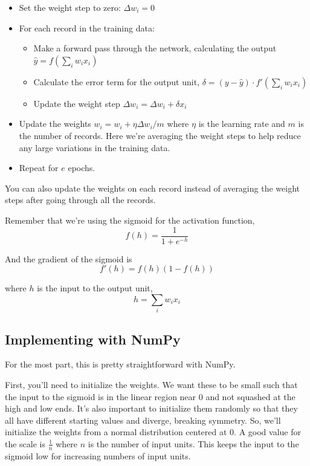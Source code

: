 \begin{itemize}
    \item Set the weight step to zero: \(\Delta w_i = 0\)
    \item For each record in the training data:

\begin{itemize}
        \item Make a forward pass through the network, calculating the output \(\hat{y}=f(\sum_i w_i x_i)\)
        \item Calculate the error term for the output unit, \(\delta=(y-\hat{y})\cdot f'(\sum_i w_i x_i)\)
        \item Update the weight step \(\Delta w_i=\Delta w_i + \delta x_i\)
\end{itemize}

    \item Update the weights \(w_i=w_i+\eta \Delta w_i/m\) where \(\eta\) is the learning rate and \(m\) is the number of records. Here we're averaging the weight steps to help reduce any large variations in the training data.
    \item Repeat for \(e\) epochs.
\end{itemize}
You can also update the weights on each record instead of averaging the weight steps after going through all the records. \newline

Remember that we're using the sigmoid for the activation function, \[f(h)=\frac{1}{1+e^{-h}}\]

And the gradient of the sigmoid is \[f'(h)=f(h)(1-f(h))\]

where \(h\) is the input to the output unit,\[h=\sum_i w_i x_i\]

\subsection{Implementing with NumPy}

For the most part, this is pretty straightforward with NumPy.

First, you'll need to initialize the weights. We want these to be small such that the input to the sigmoid is in the linear region near 0 and not squashed at the high and low ends. It's also important to initialize them randomly so that they all have different starting values and diverge, breaking symmetry. So, we'll initialize the weights from a normal distribution centered at 0. A good value for the scale is \(\frac{1}{n}\)  where \(n\) is the number of input units. This keeps the input to the sigmoid low for increasing numbers of input units.

